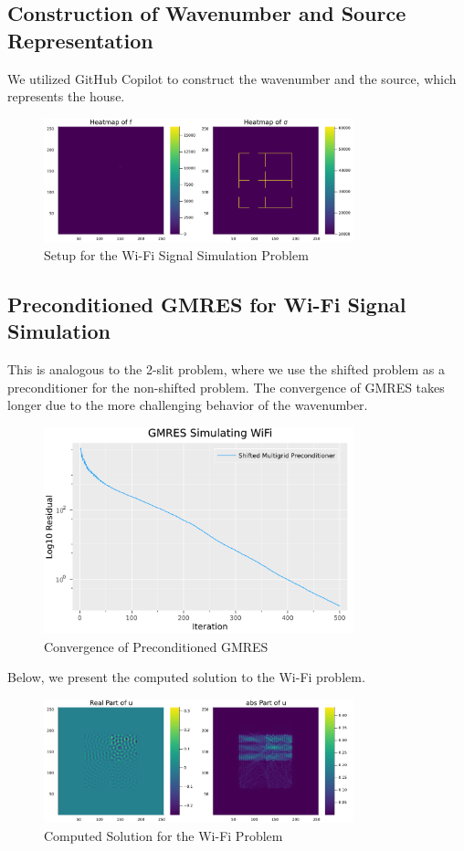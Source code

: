\documentclass[a4paper,12pt]{article}
\begin{document}
\subsection{Construction of Wavenumber and Source Representation}
We utilized GitHub Copilot to construct the wavenumber and the source, which represents the house.

\begin{figure}[h!]
    \centering
    \includegraphics[width=0.8\textwidth]{../plots/wifi_setup.pdf}
    \caption{Setup for the Wi-Fi Signal Simulation Problem}
    \label{fig:../plots/wifi_setup.pdf}
\end{figure}

\subsection{Preconditioned GMRES for Wi-Fi Signal Simulation}

This is analogous to the 2-slit problem, where we use the shifted problem as a
preconditioner for the non-shifted problem. The convergence of GMRES takes
longer due to the more challenging behavior of the wavenumber.

\begin{figure}[h!]
    \centering
    \includegraphics[width=0.8\textwidth]{../plots/gmres_wifi.pdf}
    \caption{Convergence of Preconditioned GMRES }
    \label{fig:../plots/gmres_wifi.pdf}
\end{figure}

Below, we present the computed solution to the Wi-Fi problem.

\begin{figure}[h!]
    \centering
    \includegraphics[width=0.8\textwidth]{../plots/gmres_wifi_solution.pdf}
    \caption{Computed Solution for the Wi-Fi Problem}
    \label{fig:gmres_wifi_solution}
\end{figure}
\end{document}
